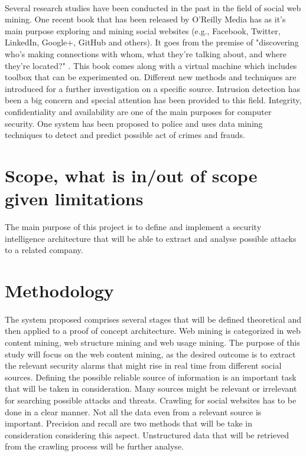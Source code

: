 \documentclass[12pt]{article}
\begin{document}
\paragraph{}
Several research studies have been conducted in the past in the field of social web mining. One recent book that has been released by  O'Reilly Media has as it's main purpose exploring and mining social websites (e.g., Facebook, Twitter, LinkedIn, Google+, GitHub and others). It goes from the premise of "discovering who’s making connections with whom, what they’re talking about, and where they’re located?" \cite{first}. This book comes along with a virtual machine which includes toolbox that can be experimented on\cite{second}. Different new methods and techniques are introduced for a further investigation on a specific source. Intrusion detection\cite{intrusion-detection} has been a big concern and special attention has been provided to this field. Integrity, confidentiality and availability are one of the main purposes for computer security.  One system\cite{third} has been proposed to police and uses data mining techniques to  detect and predict possible act of crimes and frauds. 


\section{Scope, what is in/out of scope given limitations}

The main purpose of this project is to define and implement a security intelligence architecture that will be able to extract and analyse possible attacks to a related company. 

 
\section{Methodology}
\paragraph{}
The system proposed comprises several stages that will be defined theoretical and then applied to a proof of concept architecture. Web mining is categorized in web content mining, web structure mining and web usage mining. The purpose of this study will focus on the web content mining, as the desired outcome is to extract the relevant security alarms that might rise in real time from different social sources. Defining the possible reliable source of information is an important task that will be taken in consideration. Many sources might be relevant or irrelevant for searching possible attacks and threats.  Crawling for social websites has to be done in a clear manner. Not all the data even from a relevant source is important. Precision and recall are two methods that will be take in consideration considering this aspect. Unstructured data that will be retrieved from the crawling process will be further analyse.
\end{document}
